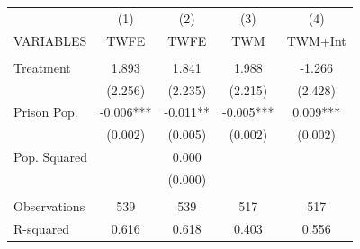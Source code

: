 \begin{tabular}{lcccc} \hline
 & (1) & (2) & (3) & (4) \\
VARIABLES & TWFE & TWFE & TWM & TWM+Int \\ \hline
 &  &  &  &  \\
Treatment & 1.893 & 1.841 & 1.988 & -1.266 \\
 & (2.256) & (2.235) & (2.215) & (2.428) \\
Prison Pop. & -0.006*** & -0.011** & -0.005*** & 0.009*** \\
 & (0.002) & (0.005) & (0.002) & (0.002) \\
Pop. Squared &  & 0.000 &  &  \\
 &  & (0.000) &  &  \\
 &  &  &  &  \\
Observations & 539 & 539 & 517 & 517 \\
 R-squared & 0.616 & 0.618 & 0.403 & 0.556 \\ \hline
\end{tabular}

